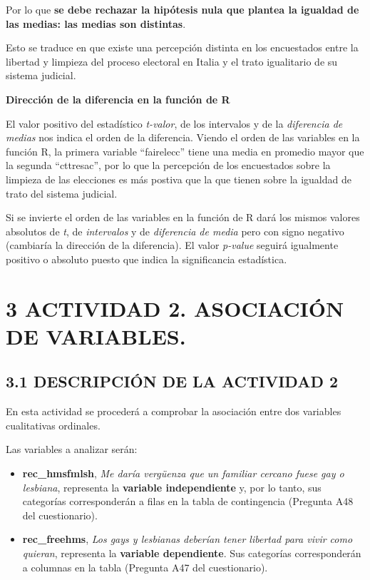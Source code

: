 \documentclass[
  12 pt,
  a4paper,
]{article}
\begin{document}
Por lo que \textbf{se debe rechazar la hipótesis nula que plantea la
igualdad de las medias: las medias son distintas}.

Esto se traduce en que existe una percepción distinta en los encuestados
entre la libertad y limpieza del proceso electoral en Italia y el trato
igualitario de su sistema judicial.

\textbf{Dirección de la diferencia en la función de R}

El valor positivo del estadístico \emph{t-valor}, de los intervalos y de
la \emph{diferencia de medias} nos indica el orden de la diferencia.
Viendo el orden de las variables en la función R, la primera variable
``fairelecc'' tiene una media en promedio mayor que la segunda
``cttresac'', por lo que la percepción de los encuestados sobre la
limpieza de las elecciones es más postiva que la que tienen sobre la
igualdad de trato del sistema judicial.

Si se invierte el orden de las variables en la función de R dará los
mismos valores absolutos de \emph{t}, de \emph{intervalos} y de
\emph{diferencia de media} pero con signo negativo (cambiaría la
dirección de la diferencia). El valor \emph{p-value} seguirá igualmente
positivo o absoluto puesto que indica la significancia estadística.

\newpage

\section{3 ACTIVIDAD 2. ASOCIACIÓN DE
VARIABLES.}\label{actividad-2.-asociaciuxf3n-de-variables.}

\subsection{3.1 DESCRIPCIÓN DE LA ACTIVIDAD
2}\label{descripciuxf3n-de-la-actividad-2}

En esta actividad se procederá a comprobar la asociación entre dos
variables cualitativas ordinales.

Las variables a analizar serán:

\begin{itemize}
\item
  \textbf{rec\_hmsfmlsh}, \emph{Me daría vergüenza que un familiar
  cercano fuese gay o lesbiana}, representa la \textbf{variable
  independiente} y, por lo tanto, sus categorías corresponderán a filas
  en la tabla de contingencia (Pregunta A48 del cuestionario).
\item
  \textbf{rec\_freehms}, \emph{Los gays y lesbianas deberían tener
  libertad para vivir como quieran}, representa la \textbf{variable
  dependiente}. Sus categorías corresponderán a columnas en la tabla
  (Pregunta A47 del cuestionario).
\end{itemize}
\end{document}
